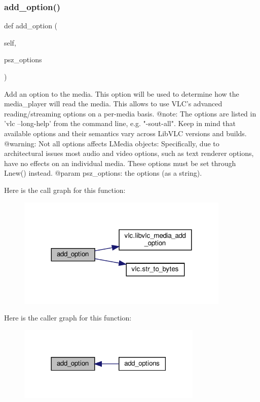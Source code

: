 \subsubsection{\texorpdfstring{add\+\_\+option()}{add\_option()}}
{\footnotesize\ttfamily def add\+\_\+option (\begin{DoxyParamCaption}\item[{}]{self,  }\item[{}]{psz\+\_\+options }\end{DoxyParamCaption})}

\begin{DoxyVerb}Add an option to the media.
This option will be used to determine how the media_player will
read the media. This allows to use VLC's advanced
reading/streaming options on a per-media basis.
@note: The options are listed in 'vlc --long-help' from the command line,
e.g. "-sout-all". Keep in mind that available options and their semantics
vary across LibVLC versions and builds.
@warning: Not all options affects L{Media} objects:
Specifically, due to architectural issues most audio and video options,
such as text renderer options, have no effects on an individual media.
These options must be set through L{new}() instead.
@param psz_options: the options (as a string).
\end{DoxyVerb}
 Here is the call graph for this function\+:
\nopagebreak
\begin{figure}[H]
\begin{center}
\leavevmode
\includegraphics[width=287pt]{classvlc_1_1_media_a408d85bfeb76d82131e6e8e817c37e0d_cgraph}
\end{center}
\end{figure}
Here is the caller graph for this function\+:
\nopagebreak
\begin{figure}[H]
\begin{center}
\leavevmode
\includegraphics[width=249pt]{classvlc_1_1_media_a408d85bfeb76d82131e6e8e817c37e0d_icgraph}
\end{center}
\end{figure}
\mbox{\label{classvlc_1_1_media_acac9b8f87cc487439af1e94a5cfb60ae}} 
